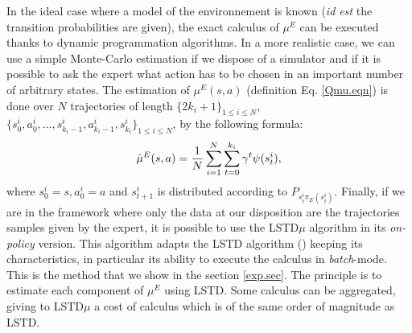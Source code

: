 \documentclass{article}
\begin{document}
In the ideal case where a model of the environnement is known (\textit{id est} the transition probabilities are given), the exact calculus of $\mu^E$ can be executed thanks to dynamic programmation algorithms. In a more realistic case, we can use a simple Monte-Carlo estimation if we dispose of a simulator and if it is possible to ask the expert what action has to be chosen in an important number of arbitrary states.
The estimation of $\mu^E(s,a)$ (definition Eq. \eqref{Qmu.eqn}) is done over $N$ trajectories of length $\{2k_i+1\}_{1\leq i \leq N}$, $\{s^i_0,a^i_0,\dots,s^i_{k_i-1},a^i_{k_i-1},s^i_{k_i}\}_{1\leq i \leq N}$, by the following formula:
\begin{equation}
\hat\mu^E(s,a) = {1\over N}\sum_{i=1}^{N}\sum^{k_i}_{t=0}\gamma^t\psi(s^i_t),
\end{equation}
where $s^i_0=s, a^i_0=a$ and $s^i_{t+1}$ is distributed according to $P_{s^i_t\pi_E(s^i_t)}$.
Finally, if we are in the framework where only the data at our disposition are the trajectories samples given by the expert, it is possible to use the LSTD$\mu$ algorithm \citep{klein2011batch} in its \emph{on-policy} version. This algorithm adapts the LSTD algorithm (\cite{bradtke1996linear}) keeping its characteristics, in particular its ability to execute the calculus in  {\it batch}-mode.
This is the method that we show in the section \ref{exp.sec}. The principle is to estimate each component of $\mu^E$ using LSTD. Some calculus can be aggregated, giving to LSTD$\mu$ a cost of calculus which is of the same order of magnitude as LSTD.
\end{document}
